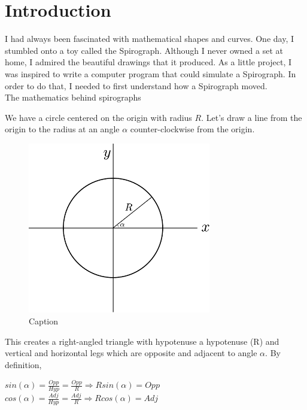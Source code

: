 \section{Introduction}
\label{sec:intro}


I had always been fascinated with mathematical shapes and curves. One day, I stumbled onto a toy called the Spirograph. Although I never owned a set at home, I admired the beautiful drawings that it produced. As a little project, I was inspired to write a computer program that could simulate a Spirograph. In order to do that, I needed to first understand how a Spirograph moved. \\

The mathematics behind spirographs 

We have a circle centered on the origin with radius $R$. Let's draw a line from the origin to the radius at an angle $\alpha$ counter-clockwise from the origin. 

\begin{figure}[h]
    \centering
    \includegraphics[width=8cm]{figures/unitcircle1.pdf}    
    \caption{Caption}
    \label{fig:my_label}
\end{figure}
This creates a right-angled triangle with hypotenuse a hypotenuse (R) and vertical and horizontal legs which are opposite and adjacent to angle $\alpha$. By definition, \\
\begin{center}
$sin(\alpha) = \frac{Opp}{Hyp} = \frac{Opp}{R} \Rightarrow Rsin(\alpha) = Opp $
\\
$cos(\alpha) = \frac{Adj}{Hyp} = \frac{Adj}{R} \Rightarrow Rcos(\alpha) = Adj $
\end{center}

